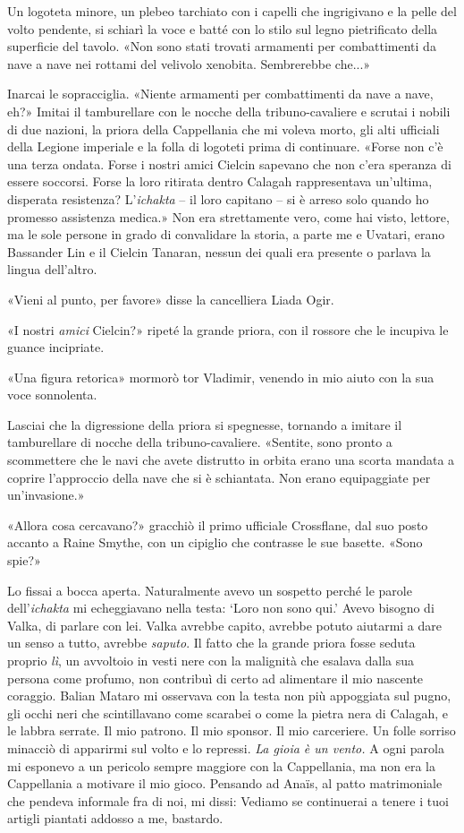 Un logoteta minore, un plebeo tarchiato con i capelli che ingrigivano e
la pelle del volto pendente, si schiarì la voce e batté con lo stilo sul
legno pietrificato della superficie del tavolo. «Non sono stati trovati
armamenti per combattimenti da nave a nave nei rottami del velivolo
xenobita. Sembrerebbe che...»

Inarcai le sopracciglia. «Niente armamenti per combattimenti da nave a
nave, eh?» Imitai il tamburellare con le nocche della tribuno-cavaliere
e scrutai i nobili di due nazioni, la priora della Cappellania che mi
voleva morto, gli alti ufficiali della Legione imperiale e la folla di
logoteti prima di continuare. «Forse non c'è una terza ondata. Forse i
nostri amici Cielcin sapevano che non c'era speranza di essere soccorsi.
Forse la loro ritirata dentro Calagah rappresentava un'ultima, disperata
resistenza? L'\emph{ichakta} -- il loro capitano -- si è arreso solo
quando ho promesso assistenza medica.» Non era strettamente vero, come
hai visto, lettore, ma le sole persone in grado di convalidare la
storia, a parte me e Uvatari, erano Bassander Lin e il Cielcin Tanaran,
nessun dei quali era presente o parlava la lingua dell'altro.

«Vieni al punto, per favore» disse la cancelliera Liada Ogir.

«I nostri \emph{amici} Cielcin?» ripeté la grande priora, con il rossore
che le incupiva le guance incipriate.

«Una figura retorica» mormorò tor Vladimir, venendo in mio aiuto con la
sua voce sonnolenta.

Lasciai che la digressione della priora si spegnesse, tornando a imitare
il tamburellare di nocche della tribuno-cavaliere. «Sentite, sono pronto
a scommettere che le navi che avete distrutto in orbita erano una scorta
mandata a coprire l'approccio della nave che si è schiantata. Non erano
equipaggiate per un'invasione.»

«Allora cosa cercavano?» gracchiò il primo ufficiale Crossflane, dal suo
posto accanto a Raine Smythe, con un cipiglio che contrasse le sue
basette. «Sono spie?»

Lo fissai a bocca aperta. Naturalmente avevo un sospetto perché le
parole dell'\emph{ichakta} mi echeggiavano nella testa: `Loro non sono
qui.' Avevo bisogno di Valka, di parlare con lei. Valka avrebbe capito,
avrebbe potuto aiutarmi a dare un senso a tutto, avrebbe \emph{saputo}.
Il fatto che la grande priora fosse seduta proprio \emph{lì}, un
avvoltoio in vesti nere con la malignità che esalava dalla sua persona
come profumo, non contribuì di certo ad alimentare il mio nascente
coraggio. Balian Mataro mi osservava con la testa non più appoggiata sul
pugno, gli occhi neri che scintillavano come scarabei o come la pietra
nera di Calagah, e le labbra serrate. Il mio patrono. Il mio sponsor. Il
mio carceriere. Un folle sorriso minacciò di apparirmi sul volto e lo
repressi. \emph{La gioia è un vento.} A ogni parola mi esponevo a un
pericolo sempre maggiore con la Cappellania, ma non era la Cappellania a
motivare il mio gioco. Pensando ad Anaïs, al patto matrimoniale che
pendeva informale fra di noi, mi dissi: Vediamo se continuerai a tenere
i tuoi artigli piantati addosso a me, bastardo.

